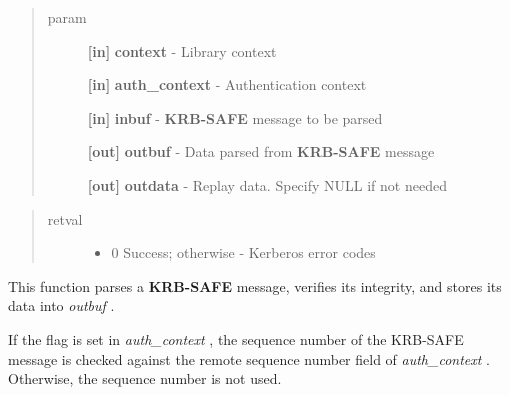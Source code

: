 \documentclass[letterpaper,10pt,english]{sphinxmanual}
\begin{document}
\begin{fulllineitems}
\label{appdev/refs/api/krb5_rd_safe:krb5_rd_safe}
\end{fulllineitems}

\begin{quote}\begin{description}
\item[{param}] \leavevmode
\textbf{{[}in{]}} \textbf{context} - Library context

\textbf{{[}in{]}} \textbf{auth\_context} - Authentication context

\textbf{{[}in{]}} \textbf{inbuf} - \textbf{KRB-SAFE} message to be parsed

\textbf{{[}out{]}} \textbf{outbuf} - Data parsed from \textbf{KRB-SAFE} message

\textbf{{[}out{]}} \textbf{outdata} - Replay data. Specify NULL if not needed

\end{description}\end{quote}
\begin{quote}\begin{description}
\item[{retval}] \leavevmode\begin{itemize}
\item {} 
0   Success; otherwise - Kerberos error codes

\end{itemize}

\end{description}\end{quote}

This function parses a \textbf{KRB-SAFE} message, verifies its integrity, and stores its data into \emph{outbuf} .

If the {\hyperref[appdev/refs/macros/KRB5_AUTH_CONTEXT_DO_SEQUENCE:KRB5_AUTH_CONTEXT_DO_SEQUENCE]{}} flag is set in \emph{auth\_context} , the sequence number of the KRB-SAFE message is checked against the remote sequence number field of \emph{auth\_context} . Otherwise, the sequence number is not used.
\end{document}
